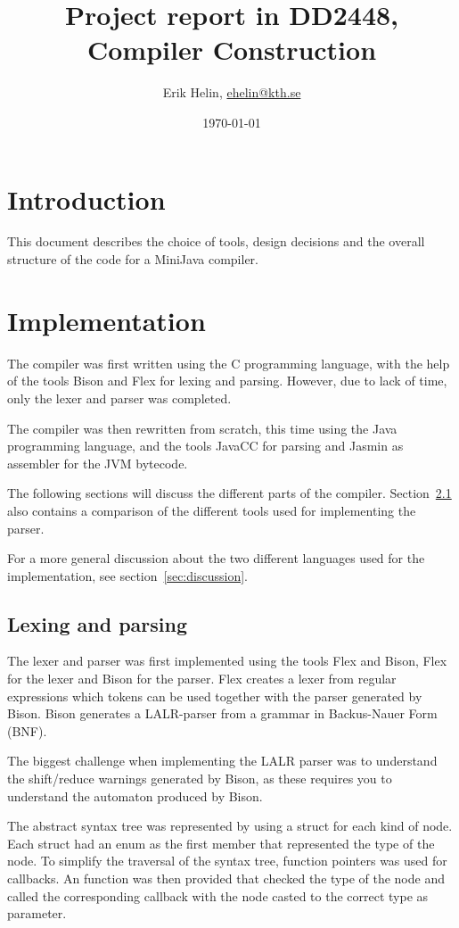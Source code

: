 \documentclass[11pt,oneside,a4paper]{article}
\begin{document}
\title{Project report in DD2448, Compiler Construction}
\author{Erik Helin, \href{mailto:ehelin@kth.se}{ehelin@kth.se}}
\date{\today}
\maketitle

\tableofcontents

\section{Introduction}
This document describes the choice of tools, design decisions and the overall 
structure of the code for a MiniJava compiler.
\section{Implementation}
The compiler was first written using the C programming language, with the help
of the tools Bison and Flex for lexing and parsing. However, due to lack of
time, only the lexer and parser was completed. 

The compiler was then rewritten from scratch, this time using the Java
programming language, and the tools JavaCC for parsing and Jasmin as assembler
for the JVM bytecode.

The following sections will discuss the different parts of the compiler.
Section~\ref{sec:lexing_and_parsing} also contains a comparison of the
different tools used for implementing the parser.

For a more general discussion about the two different languages used for the
implementation, see section~\ref{sec:discussion}.
\subsection{Lexing and parsing}
\label{sec:lexing_and_parsing}
The lexer and parser was first implemented using the tools Flex and Bison, Flex
for the lexer and Bison for the parser. Flex creates a lexer from regular
expressions which tokens can be used together with the parser generated by
Bison. Bison generates a LALR-parser from a grammar in Backus-Nauer Form (BNF). 

The biggest challenge when implementing the LALR parser was to understand
the shift/reduce warnings generated by Bison, as these requires you to
understand the automaton produced by Bison.

The abstract syntax tree was represented by using a struct for each kind of
node. Each struct had an enum as the first member that represented 
the type of the node. To simplify the traversal of the syntax tree, 
function pointers was used for callbacks. An function was then provided that 
checked the type of the node and called the corresponding callback with the node
casted to the correct type as parameter.
\end{document}
